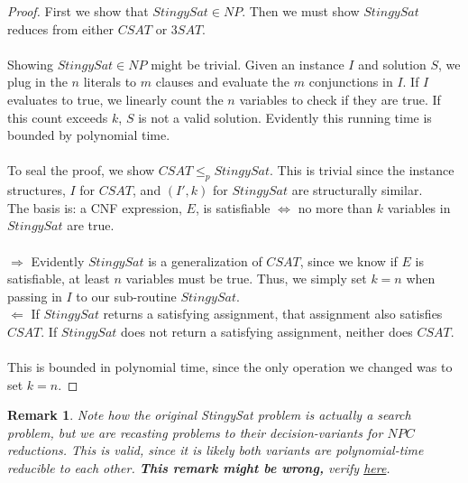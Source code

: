 \documentclass{article}
\newtheorem{remark}{Remark}
\theoremstyle{definition}
\begin{document}
\begin{proof}
	First we show that $StingySat \in NP$. Then we must show $StingySat$ reduces from either $CSAT$ or $3SAT$.\\\\
	Showing $StingySat \in NP$ might be trivial. Given an instance $I$ and solution $S$, we plug in the $n$ literals to $m$ clauses and evaluate the $m$ conjunctions in $I$. If $I$ evaluates to true, we linearly count the $n$ variables to check if they are true. If this count exceeds $k$, $S$ is not a valid solution. Evidently this running time is bounded  by polynomial time.\\\\
	To seal the proof, we show $CSAT \leq_p StingySat$. This is trivial since the instance structures, $I$ for $CSAT$, and $(I',k)$ for $StingySat$ are structurally similar. \\
	The basis is: a CNF expression, $E$, is satisfiable $\iff$ no more than $k$ variables in $StingySat$ are true.\\\\
	$\Rightarrow$ Evidently $StingySat$ is a generalization of $CSAT$, since we know if $E$ is satisfiable, at least $n$ variables must be true. Thus, we simply set $k=n$ when passing in $I$ to our sub-routine $StingySat$. \\
	$\Leftarrow$ If $StingySat$ returns a satisfying assignment, that assignment also satisfies $CSAT$. If $StingySat$ does not return a satisfying assignment, neither does $CSAT$. \\\\
	This is bounded in polynomial time, since the only operation we changed was to set $k=n$.
\end{proof}

\begin{remark}
	Note how the original \textit{StingySat} problem is actually a \textit{search} problem, but we are recasting problems to their decision-variants for $NPC$ reductions. This is valid, since it is likely both variants are polynomial-time reducible to each other. \textbf{This remark might be wrong,} verify \href{https://piazza.com/class/k52uzg6xjkl5xz?cid=879}{here}.
\end{remark}
\end{document}
